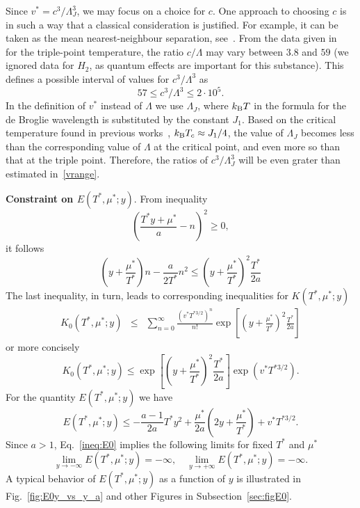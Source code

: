 \documentclass[12pt]{article}
\numberwithin{equation}{section}
\begin{document}
	Since $v^* = c^3/\Lambda_J^3$, we may focus on a choice for $c$. One approach to choosing $c$ is in such a way that a classical consideration is justified. For example, it can be taken as the mean nearest-neighbour separation, see~\cite[Sec.~1.1]{HansenMcDonald13}. From the data given in~\cite[Table~1.1]{HansenMcDonald13} for the triple-point temperature, the ratio $c/\Lambda$ may vary between $3.8$ and $59$ (we ignored data for $H_2$, as quantum effects are important for this substance). This defines a possible interval of values for $c^3/\Lambda^3$ as
	\begin{equation}
		\label{vrange}
		57 \leq c^3/\Lambda^3 \leq 2 \cdot 10^5.
	\end{equation}
	In the definition of $v^*$ instead of $\Lambda$ we use $\Lambda_J$, where $k_{\rm B} T$ in the formula for the de Broglie wavelength is substituted by the constant $J_1$. Based on the critical temperature found in previous works~\cite{KKD18, KKD20, KD22}, $k_{\rm B}T_c \approx J_1/4$, the value of $\Lambda_J$ becomes less than the corresponding value of $\Lambda$ at the critical point, and even more so than that at the triple point. Therefore, the ratios of $c^3/\Lambda_J^3$ will be even grater than estimated in~\eqref{vrange}. 
	
	\textbf{Constraint on $E(T^*,\mu^*;y)$}. From inequality
	\begin{equation}
		\left(\frac{T^* y + \mu^*}{a} - n \right)^2 \geq 0,
	\end{equation}
	it follows
	\begin{equation}
		\left(y + \frac{\mu^*}{T^*}\right)n - \frac{a}{2T^*}n^2 \leq \left(y + \frac{\mu^*}{T^*}\right)^2 \frac{T^*}{2a}
	\end{equation}
	The last inequality, in turn, leads to corresponding inequalities for $K(T^*,\mu^*;y)$
	\begin{eqnarray}
		K_0(T^*,\mu^*;y) & \leq & \sum_{n=0}^{\infty}\frac{(v^* T^{*3/2})^n}{n!} \exp[\left(y+\frac{\mu^*}{T^*}\right)^2 \frac{T^*}{2a}]
	\end{eqnarray}
	or more concisely
	\begin{equation}
		K_0(T^*,\mu^*;y) \leq \exp[\left(y+\frac{\mu^*}{T^*}\right)^2 \frac{T^*}{2a}] \exp(v^* T^{*3/2}).
	\end{equation}
	For the quantity $E(T^*,\mu^*;y)$ we have
	\begin{equation}
		\label{ineq:E0}
		E(T^*,\mu^*;y) \leq -\frac{a-1}{2a} T^* y^2 + \frac{\mu^*}{2a}\left(2y + \frac{\mu^*}{T^*}\right) + v^* T^{*3/2}.
	\end{equation}
	Since $a>1$, Eq.~\eqref{ineq:E0} implies the following limits for fixed $T^*$ and $\mu^*$
	\begin{equation}
		\lim_{y \to -\infty} E(T^*,\mu^*;y) = -\infty, \quad \lim\limits_{y \to +\infty} E(T^*,\mu^*;y) = -\infty.
	\end{equation}
	A typical behavior of $E(T^*,\mu^*;y)$ as a function of $y$ is illustrated in Fig.~\ref{fig:E0y_vs_y_a} and other Figures in Subsection~\ref{sec:figE0}.
	
\end{document}
